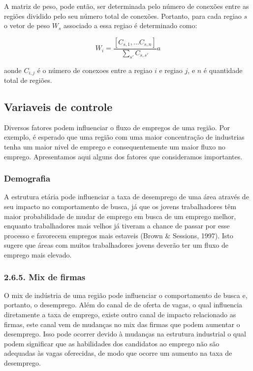 \documentclass[]{article}
\begin{document}
A matriz de peso, pode então, ser determinada pelo número de conexões
entre as regiões dividido pelo seu número total de conexões. Portanto,
para cada regiao \(s\) o vetor de peso \(W_s\) associado a essa regiao é
determinado como:

\[W_i = \frac{\left[C_{s, 1}, \dots C_{s, n}\right]}{\sum_{s'} C_{s, s'}}a \]

aonde \(C_{i, j}\) é o número de conexoes entre a regiao \(i\) e regiao
\(j\), e \(n\) é quantidade total de regiões.

\subsection{Variaveis de controle}\label{variaveis-de-controle}

Diversos fatores podem influenciar o fluxo de empregos de uma região.
Por exemplo, é esperado que uma região com uma maior concentração de
industrias tenha um maior nivel de emprego e consequentemente um maior
fluxo no emprego. Apresentamos aqui alguns dos fatores que consideramos
importantes.

\subsubsection{Demografia}\label{demografia}

A estrutura etária pode influenciar a taxa de desemprego de uma área
através de seu impacto no comportamento de busca, já que os jovens
trabalhadores têm maior probabilidade de mudar de emprego em busca de um
emprego melhor, enquanto trabalhadores mais velhos já tiveram a chance
de passar por esse processo e favorecem empregos mais estaveis (Brown \&
Sessions, 1997). Isto sugere que áreas com muitos trabalhadores jovens
deverão ter um fluxo de emprego mais elevado.

\subsubsection{2.6.5. Mix de firmas}\label{mix-de-firmas}

O mix de indústria de uma região pode influenciar o comportamento de
busca e, portanto, o desemprego. Além do canal de de oferta de vagas, o
qual influencia diretamente a taxa de emprego, existe outro canal de
impacto relacionado as firmas, este canal vem de mudanças no mix das
firmas que podem aumentar o desemprego. Isso pode ocorrer devido à
mudanças na estrutura industrial o qual podem significar que as
habilidades dos candidatos ao emprego não são adequadas às vagas
oferecidas, de modo que ocorre um aumento na taxa de desemprego.
\end{document}
